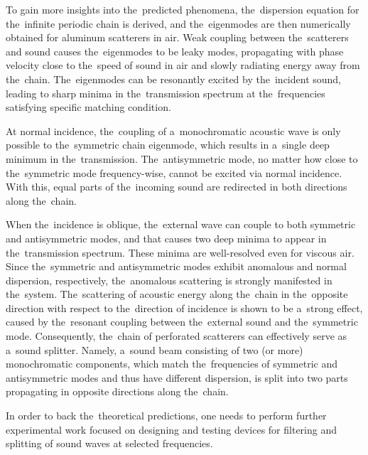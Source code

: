 To gain more insights into the~predicted phenomena, the~dispersion equation for the~infinite periodic chain is derived, and the~eigenmodes are then numerically obtained for aluminum scatterers in air.
Weak coupling between the~scatterers and sound causes the~eigenmodes to be leaky modes, propagating with phase velocity close to the~speed of sound in air and slowly radiating energy away from the~chain.
The~eigenmodes can be resonantly excited by the~incident sound, leading to sharp minima in the~transmission spectrum at the~frequencies satisfying specific matching condition.

At normal incidence, the~coupling of a~monochromatic acoustic wave is only possible to the~symmetric chain eigenmode, which results in a~single deep minimum in the~transmission.
The~antisymmetric mode, no matter how close to the~symmetric mode frequency-wise, cannot be excited via normal incidence.
With this, equal parts of the~incoming sound are redirected in both directions along the~chain.

When the~incidence is oblique, the~external wave can couple to both symmetric and antisymmetric modes, and that causes two deep minima to appear in the~transmission spectrum.
These minima are well-resolved even for viscous air.
Since the~symmetric and antisymmetric modes exhibit anomalous and normal dispersion, respectively, the~anomalous scattering is strongly manifested in the~system.
The~scattering of acoustic energy along the~chain in the~opposite direction with respect to the~direction of incidence is shown to be a~strong effect, caused by the~resonant coupling between the~external sound and the~symmetric mode.
Consequently, the~chain of perforated scatterers can effectively serve as a~sound splitter.
Namely, a~sound beam consisting of two (or more) monochromatic components, which match the~frequencies of symmetric and antisymmetric modes and thus have different dispersion, is split into two parts propagating in opposite directions along the~chain.

In order to back the~theoretical predictions, one needs to perform further experimental work focused on designing and testing devices for filtering and splitting of sound waves at selected frequencies.


